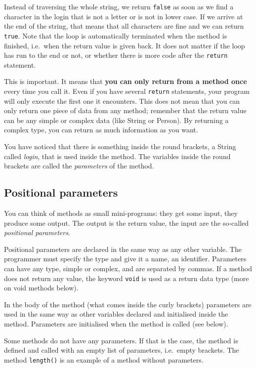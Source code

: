 Instead of traversing the whole string, we return \verb+false+ as soon
as we find a character in the login that is not a letter or is not
in lower case. If we arrive at the end of the string, that means that
all characters are fine and we can return \verb+true+. Note that the
loop is automatically terminated when the method is finished,
i.e.~when the return value is given back. It does not matter if the
loop has run to the end or not, or whether there is more code after
the \verb+return+ statement. 

This is important.
It means that \textbf{you can only return from a method once} 
every time you call it. Even if you have
several \verb+return+ statements, your program will only execute the
first one it encounters. This does not mean that you can only return
one piece of data from any method; remember that the return value can
be any simple or complex data (like String or Person). By returning a
complex type, you can return as much information as you want. 

You have noticed that there is something inside the round brackets, a
String called \emph{login}, that is used inside the method. The
variables inside the round brackets are called the \emph{parameters} of the
method. 

\subsection{Positional parameters}
\label{sec:pospar}

You can think of methods as small mini-programs: they get some input,
they produce some output. The output is the return value, the input
are the so-called \emph{positional parameters}. 

Positional parameters are declared in the same way as any other
variable. The programmer must specify the type and give it a name, an
identifier. Parameters can have any type, simple or complex, and
are separated by commas. If a method does not return any value, the
keyword \verb+void+ is used as a return data type (more on void methods
below).

In the body of the method (what comes inside the curly
brackets) parameters are used in the same way 
as other variables declared and
initialised inside the method. Parameters are initialised when the
method is called (see below). 

Some methods do not have any parameters. If that is the case, the
method is defined and called with an empty list of parameters,
i.e.~empty brackets. The method \verb+length()+ is an example of a
method without parameters. 

